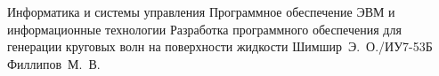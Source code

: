 \documentclass{bmstu}
\begin{document}
\renewcommand{\thelstlisting}{\arabic{lstlisting}}

\makecourseworktitle
    {Информатика и системы управления}
    {Программное обеспечение ЭВМ и информационные технологии}
    {Разработка программного обеспечения для генерации круговых волн на поверхности жидкости}
    {Шимшир~Э.~О./ИУ7-53Б}
    {Филлипов~М.~В.}
    {}

\maketableofcontents

 
 
 
 





\makebibliography
\end{document}
